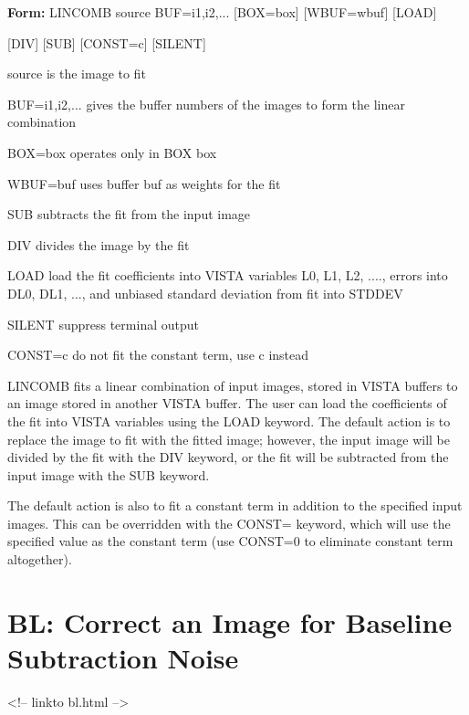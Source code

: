 \begin{command}
  \item[\textbf{Form: } LINCOMB source BUF=i1,i2,... {[BOX=box]} 
       {[WBUF=wbuf]} {[LOAD]}\hfill]{}
  \item{{[DIV]} {[SUB]} {[CONST=c]} {[SILENT]}}
  \item[source]{is the image to fit}
  \item[BUF=i1,i2,...]{gives the buffer numbers of the images to form
       the linear combination}
  \item[BOX=box]{operates only in BOX box}
  \item[WBUF=buf]{uses buffer buf as weights for the fit}
  \item[SUB]{subtracts the fit from the input image}
  \item[DIV]{divides the image by the fit}
  \item[LOAD]{load the fit coefficients into VISTA variables
       L0, L1, L2, ...., errors into DL0, DL1, ..., and
       unbiased standard deviation from fit into STDDEV}
  \item[SILENT]{suppress terminal output}
  \item[CONST=c]{do not fit the constant term, use c instead}
\end{command}

LINCOMB fits a linear combination of input images, stored in VISTA buffers
to an image stored in another VISTA buffer. The user can load the
coefficients of the fit into VISTA variables using the LOAD keyword. The
default action is to replace the image to fit with the fitted image;
however, the input image will be divided by the fit with the DIV keyword,
or the fit will be subtracted from the input image with the SUB keyword.

The default action is also to fit a constant term in addition to the
specified input images. This can be overridden with the CONST= keyword,
which will use the specified value as the constant term (use CONST=0 to
eliminate constant term altogether).

\section{BL: Correct an Image for Baseline Subtraction Noise}
\begin{rawhtml}
<!-- linkto bl.html -->
\end{rawhtml}

